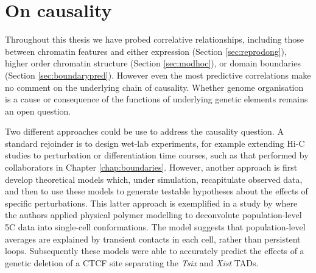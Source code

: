 \documentclass[a4paper,11pt,oneside]{book}
\begin{document}
\section{On causality}


Throughout this thesis we have probed correlative relationships, including those between chromatin features and either expression (Section \ref{sec:reprodong}), higher order chromatin structure (Section \ref{sec:modhoc}), or domain boundaries (Section \ref{sec:boundarypred}). However even the most predictive correlations make no comment on the underlying chain of causality. Whether genome organisation is a cause or consequence of the functions of underlying genetic elements remains an open question.\cite{Sexton2015}


Two different approaches could be use to address the causality question. A standard rejoinder is to design wet-lab experiments, for example extending Hi-C studies to perturbation or differentiation time courses, such as that performed by collaborators in Chapter \ref{chap:boundaries}. However, another approach is first develop theoretical models which, under simulation, recapitulate observed data, and then to use these models to generate testable hypotheses about the effects of specific perturbations. This latter approach is exemplified in a study by \citet{Giorgetti2014a} where the authors applied physical polymer modelling to deconvolute population-level 5C data into single-cell conformations. The model suggests that population-level averages are explained by transient contacts in each cell, rather than persistent loops. Subsequently these models were able to accurately predict the effects of a genetic deletion of a CTCF site separating the \emph{Tsix} and \emph{Xist} TADs.\cite{Giorgetti2014a} 
\end{document}
